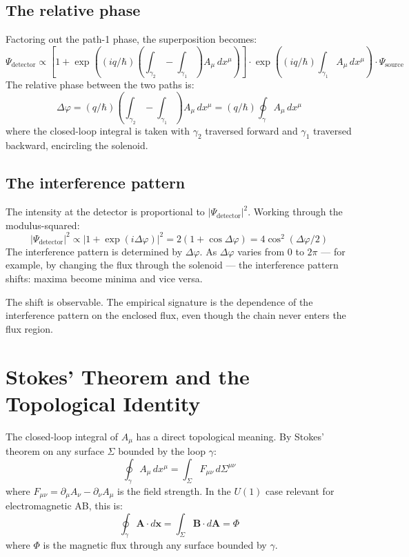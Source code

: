 \documentclass[11pt,a4paper]{article}
\begin{document}
\subsection{The relative phase}

Factoring out the path-1 phase, the superposition becomes:
\[
\Psi_{\mathrm{detector}} \propto \left[1 + \exp\!\left((iq/\hbar) \left(\int_{\gamma_2} - \int_{\gamma_1}\right) A_\mu \, dx^\mu\right)\right] \cdot \exp\!\left((iq/\hbar) \int_{\gamma_1} A_\mu \, dx^\mu\right) \cdot \Psi_{\mathrm{source}}
\]
The relative phase between the two paths is:
\[
\Delta \varphi = (q/\hbar) \left(\int_{\gamma_2} - \int_{\gamma_1}\right) A_\mu \, dx^\mu = (q/\hbar) \oint_\gamma A_\mu \, dx^\mu
\]
where the closed-loop integral is taken with $\gamma_2$ traversed forward and $\gamma_1$ traversed backward, encircling the solenoid.

\subsection{The interference pattern}

The intensity at the detector is proportional to $|\Psi_\mathrm{detector}|^2$. Working through the modulus-squared:
\[
|\Psi_{\mathrm{detector}}|^{2} \propto |1 + \exp(i\Delta \varphi)|^{2} = 2(1 + \cos \Delta \varphi) = 4 \cos^{2}(\Delta \varphi /2)
\]
The interference pattern is determined by $\Delta\varphi$. As $\Delta\varphi$ varies from 0 to $2\pi$ --- for example, by changing the flux through the solenoid --- the interference pattern shifts: maxima become minima and vice versa.

The shift is observable. The empirical signature is the dependence of the interference pattern on the enclosed flux, even though the chain never enters the flux region.

\section{Stokes' Theorem and the Topological Identity}

The closed-loop integral of $A_\mu$ has a direct topological meaning. By Stokes' theorem on any surface $\Sigma$ bounded by the loop $\gamma$:
\[
\oint_\gamma A_\mu \, dx^\mu = \int_\Sigma F_{\mu \nu} \, d\Sigma^{\mu \nu}
\]
where $F_{\mu\nu} = \partial_\mu A_\nu - \partial_\nu A_\mu$ is the field strength. In the $U(1)$ case relevant for electromagnetic AB, this is:
\[
\oint_\gamma \mathbf{A} \cdot d\mathbf{x} = \int_\Sigma \mathbf{B} \cdot d\mathbf{A} = \Phi
\]
where $\Phi$ is the magnetic flux through any surface bounded by $\gamma$.
\end{document}
